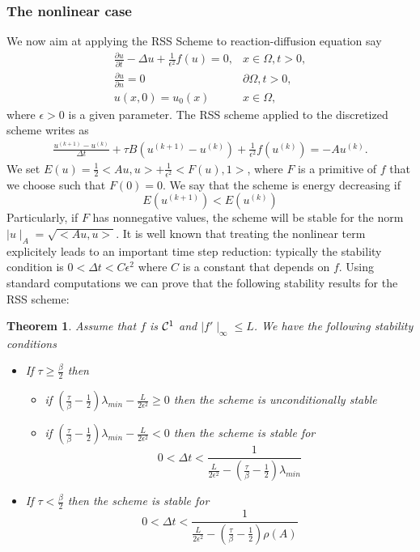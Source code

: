 \documentclass[11pt]{article}
\newtheorem{theorem}{Theorem}[section]
\newcommand{\Frac}[2] {\frac{\textstyle #1} {\textstyle #2}}
\begin{document}
{\subsubsection{The nonlinear case}
We now aim at applying the RSS Scheme to reaction-diffusion equation say
\begin{eqnarray}
\Frac{\partial u}{\partial t} -\Delta u +\Frac{1}{\epsilon^2}f(u)=0, & x\in \Omega, t>0,\\
\Frac{\partial u}{\partial n}= 0 & \partial \Omega , t>0,\\
u(x,0)=u_0(x) & x\in \Omega ,
\end{eqnarray}
 where $\epsilon >0$ is a given parameter. The RSS scheme applied to the discretized scheme writes as
\begin{eqnarray}
 \Frac{u^{(k+1)}-u^{(k)}}{\Delta t} +\tau B (u^{(k+1)}-u^{(k)}) +\Frac{1}{\epsilon^2}f(u^{(k)}) =-Au^{(k)}.
 \label{RSSAC}
 \end{eqnarray}
 We set $E(u)=\Frac{1}{2}<Au,u>+\Frac{1}{\epsilon^2}<F(u),1>$, where $F$ is a primitive of $f$ that we choose such that $F(0)=0$. We say that the scheme is energy decreasing if
 $$
 E(u^{(k+1)}) < E(u^{(k)})
 $$
Particularly,  if $F$ has nonnegative values, the scheme will be stable for the norm 
$\mid u \mid_A=\sqrt{<Au,u>}$. It is well known that treating the nonlinear term explicitely leads to an important time step reduction: typically the stability condition is 
$0<\Delta t < C \epsilon^2$ where $C$ is a constant that depends on $f$. Using standard computations
 we can prove that the following stability results for the RSS scheme: 
\begin{theorem}
Assume that $f$ is ${\cal C}^1$ and $\mid f'\mid_{\infty}\le L$. We have the following stability conditions
\begin{itemize}
\item If $\tau\ge \Frac{\beta}{2}$ then
\begin{itemize}
\item if $\left(\Frac{\tau}{\beta}-\Frac{1}{2}\right)\lambda_{min} -\Frac{L}{2\epsilon^2}\ge 0$ then the scheme is unconditionally stable
\item if $\left(\Frac{\tau}{\beta}-\Frac{1}{2}\right)\lambda_{min} -\Frac{L}{2\epsilon^2}< 0$ then the scheme is stable for
$$
0<\Delta t <\Frac{1}{\Frac{L}{2\epsilon^2} -\left(\Frac{\tau}{\beta}-\Frac{1}{2}\right)\lambda_{min}}
$$
\end{itemize}
\item If $\tau < \Frac{\beta}{2}$ then the scheme is stable for
$$
0<\Delta t <\Frac{1}{\Frac{L}{2\epsilon^2} -\left(\Frac{\tau}{\beta}-\Frac{1}{2}\right)\rho(A)}
$$
\end{itemize}
\end{theorem}}
\end{document}
